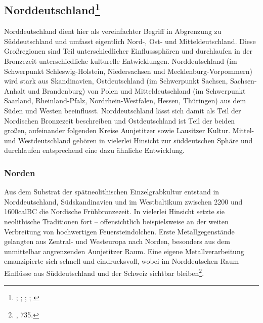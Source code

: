 \documentclass[openany,twoside,twocolumn]{book}
\let\rmarkdownfootnote\footnote%
\def\footnote{\protect\rmarkdownfootnote}
\begin{document}
\hypertarget{norddeutschland}{%
\subsection[Norddeutschland]{\texorpdfstring{Norddeutschland\footnote{\textcite{gorner_bestattungssitten_2002};
  \textcite{hofmann_rituelle_2008}; \textcite{jockenhovel_germany_2013};
  \textcite{jockenhovel_von_2003}; \textcite{schmidt_studien_1993}}}{Norddeutschland}}\label{norddeutschland}}

Norddeutschland dient hier als vereinfachter Begriff in Abgrenzung zu
Süddeutschland und umfasst eigentlich Nord-, Ost- und Mitteldeutschland.
Diese Großregionen sind Teil unterschiedlicher Einflusssphären und
durchlaufen in der Bronzezeit unterschiedliche kulturelle Entwicklungen.
Norddeutschland (im Schwerpunkt Schleswig-Holstein, Niedersachsen und
Mecklenburg-Vorpommern) wird stark aus Skandinavien, Ostdeutschland (im
Schwerpunkt Sachsen, Sachsen-Anhalt und Brandenburg) von Polen und
Mitteldeutschland (im Schwerpunkt Saarland, Rheinland-Pfalz,
Nordrhein-Westfalen, Hessen, Thüringen) aus dem Süden und Westen
beeinflusst. Norddeutschland lässt sich damit als Teil der Nordischen
Bronzezeit beschreiben und Ostdeutschland ist Teil der beiden großen,
aufeinander folgenden Kreise Aunjetitzer sowie Lausitzer Kultur. Mittel-
und Westdeutschland gehören in vielerlei Hinsicht zur süddeutschen
Sphäre und durchlaufen entsprechend eine dazu ähnliche Entwicklung.

\hypertarget{norden}{%
\subsubsection{Norden}\label{norden}}

Aus dem Substrat der spätneolithischen Einzelgrabkultur entstand in
Norddeutschland, Südskandinavien und im Westbaltikum zwischen 2200 und
1600calBC die Nordische Frühbronzezeit. In vielerlei Hinsicht setzte sie
neolithische Traditionen fort -- offensichtlich beispielsweise an der
weiten Verbreitung von hochwertigen Feuersteindolchen. Erste
Metallgegenstände gelangten aus Zentral- und Westeuropa nach Norden,
besonders aus dem unmittelbar angrenzenden Aunjetitzer Raum. Eine eigene
Metallverarbeitung emanzipierte sich schnell und eindrucksvoll, wobei im
Norddeutschen Raum Einflüsse aus Süddeutschland und der Schweiz sichtbar
bleiben\footnote{\textcite{jockenhovel_germany_2013}, 735.}.
\end{document}
